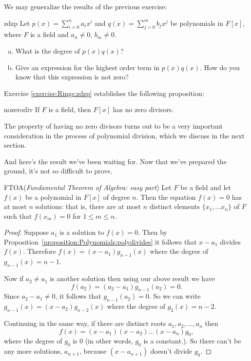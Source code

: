 \noindent
We may generalize the results of the previous exercise:

\begin{exercise}{zdzp}
Let $p(x)=\sum_{i=0}^{n} a_ix^i$ and $q(x)=\sum_{j=0}^{m} b_jx^j$ be polynomials in $F[x]$, where $F$ is a field and $a_n\neq 0$, $b_m\neq 0$.
\begin{enumerate}[(a)]
\item
What is the degree of $p(x)q(x)$?
\item
Give an expression for the highest order term in $p(x)q(x)$. How do you know that this expression is not zero? 
\end{enumerate}
\end{exercise}

Exercise \ref{exercise:Rings:zdzp} establishes the following proposition: 

\begin{prop}{nozerodiv} If $F$ is a field, then $F[x]$ has no zero divisors.
\end{prop}

The property of having no zero divisors turns out to be a very important consideration in the process of polynomial division, which we discuss in the next section.

And here's the result we've been waiting for. Now that we've prepared the ground, it's not so difficult to prove.

\begin{prop}{FTOA}(\emph{Fundamental Theorem of Algebra: easy part})
Let $F$ be a field and let $f(x)$ be a polynomial in $F[x]$ of degree $n$. Then the equation $f(x)=0$ has at most $n$ solutions: that is, there are at most $n$ distinct elements $\{x_1,\ldots x_n\}$ of $F$ such that $f(x_m)=0$ for $1 \le m \le n$.
\end {prop}


\begin{proof}
Suppose $a_1$ is a solution to $f(x)=0$. Then by Proposition~\ref{proposition:Polynomials:polydivides} it follows that $x-a_1$ divides $f(x)$. Therefore $f(x) = (x-a_1) g_{n-1}(x)$ where the degree of $g_{n-1}(x)=n-1$. 

Now if $a_2 \neq a_1$ is another solution then using our above result we have
\[ f(a_2) = (a_2 - a_1)g_{n-1}(a_2) = 0. \]
Since $a_2 - a_1 \neq 0$, it follows that $g_{n-1}(a_2) = 0$. So we can write $g_{n - 1}(x) = (x-a_2)g_{n-2}(x)$ where the degree of $g_2(x) = n-2$. 

Continuing in the same way, if there are distinct roots $a_1,a_2,...,a_n$ then 
\[
f(x) = (x - a_1)(x - a_2)...(x - a_n)g_0, \]
 where the degree of $g_0$ is 0 (in other words, $g_0$ is a constant.). So there can't be any more solutions, $a_{n+1}$, because $(x-a_{n+1})$ doesn't divide $g_0$.
\end {proof}


